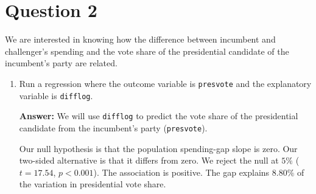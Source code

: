 \documentclass[12pt,letterpaper]{article}
\newcommand{\rcode}[2]{}
\newcommand{\answer}{\par\vspace{.18cm}\noindent\textbf{Answer:} }
\begin{document}
\newpage

\section{Question 2}
\noindent We are interested in knowing how the difference between incumbent and challenger's spending and the vote share of the presidential candidate of the incumbent's party are related.

\begin{enumerate}[(1)]
\setlength{\itemsep}{4pt}\setlength{\parsep}{2pt}
\item Run a regression where the outcome variable is \texttt{presvote} and the explanatory variable is \texttt{difflog}.

\answer We will use \texttt{difflog} to predict the vote share of the presidential
candidate from the incumbent’s party (\texttt{presvote}).

\rcode{72}{74}

\par\nobreak
{\footnotesize\setlength{\tabcolsep}{4pt}\renewcommand{\arraystretch}{0.93}%
\noindent{}\par}
\smallskip


Our null hypothesis is that the population spending-gap slope is zero. Our two-sided
alternative is that it differs from zero. We reject the null at $5\%$ ($t = 17.54$, $p < 0.001$).
The association is positive. The gap explains $8.80\%$ of the variation in presidential
vote share.


\end{enumerate}
\end{document}
